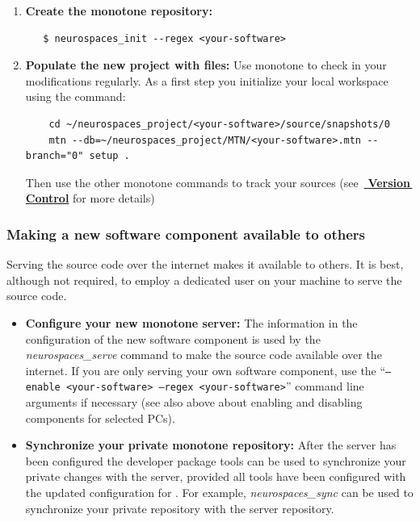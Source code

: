 \documentclass[12pt]{article}
\begin{document}
\begin{enumerate}
\item {\bf Create the monotone repository:}
\begin{verbatim}
   $ neurospaces_init --regex <your-software>
\end{verbatim}

\item {\bf Populate the new project with files:} Use monotone to check
  in your modifications regularly.  As a first step you initialize
  your local workspace using the command:
\begin{verbatim}
    cd ~/neurospaces_project/<your-software>/source/snapshots/0
    mtn --db=~/neurospaces_project/MTN/<your-software>.mtn --branch="0" setup .
\end{verbatim}
  Then use the other monotone commands to track your sources
  (see~\href{../version-control/version-control.tex}{\bf
    Version\,Control} for more details)
\end{enumerate}

\subsubsection*{Making a new software component available to others}

Serving the source code over the internet makes it available to
others.  It is best, although not required, to employ a dedicated user on
your machine to serve the source code.

\begin{itemize}
\item {\bf Configure your new monotone server:} The information in the
  configuration of the new software component is used by the {\it
    neurospaces\_serve} command to make the source code available over
  the internet.  If you are only serving your own software component,
  use the ``{\tt --enable <your-software> --regex <your-software>}''
  command line arguments if necessary (see also above about enabling
  and disabling components for selected PCs).
  
\item {\bf Synchronize your private monotone repository:} After the
  server has been configured the developer package tools can be used to
  synchronize your private changes with the server, provided all tools
  have been configured with the updated configuration for
  {\tt <your-software>}.  For example, {\it neurospaces\_sync} can be used
  to synchronize your private repository with the server repository.
\end{itemize}
  
\end{document}

